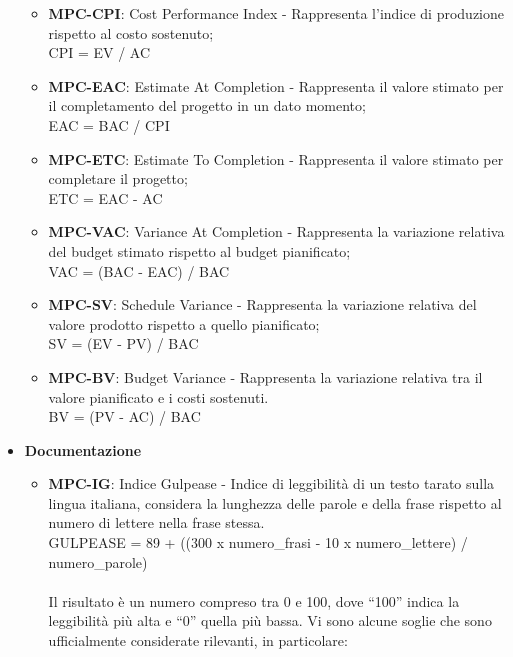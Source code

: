 \begin{itemize}
\begin{itemize}
            \item \textbf{MPC-CPI}: Cost Performance Index - Rappresenta l'indice di produzione rispetto al costo sostenuto;\\
                CPI = EV / AC\\
            \item \textbf{MPC-EAC}: Estimate At Completion - Rappresenta il valore stimato per il completamento del progetto in un dato momento;\\
                EAC = BAC / CPI\\ 
            \item \textbf{MPC-ETC}: Estimate To Completion - Rappresenta il valore stimato per completare il progetto;\\
                ETC = EAC - AC\\
            \item \textbf{MPC-VAC}: Variance At Completion - Rappresenta la variazione relativa del budget stimato rispetto al budget pianificato;\\
                VAC = (BAC - EAC) / BAC\\
            \item \textbf{MPC-SV}: Schedule Variance - Rappresenta la variazione relativa del valore prodotto rispetto a quello pianificato;\\
                SV = (EV - PV) / BAC\\
            \item \textbf{MPC-BV}: Budget Variance - Rappresenta la variazione relativa tra il valore pianificato e i costi sostenuti.\\
                BV = (PV - AC) / BAC\\
        \end{itemize}
    \item \textbf{Documentazione}
        \begin{itemize}
            \item \textbf{MPC-IG}: Indice Gulpease - Indice di leggibilità di un testo tarato sulla lingua italiana, considera la lunghezza delle parole e della frase rispetto al numero di lettere nella frase stessa.\\
                GULPEASE = 89 + ((300 x numero\_frasi - 10 x numero\_lettere) / numero\_parole)\\\\
                Il risultato è un numero compreso tra 0 e 100, dove ``100'' indica la leggibilità più alta e ``0'' quella più bassa. Vi sono alcune soglie che sono ufficialmente considerate rilevanti, in particolare:

\end{itemize}
\end{itemize}
